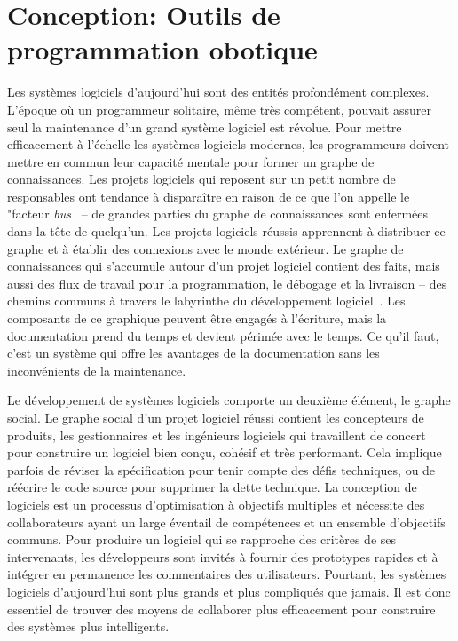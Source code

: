 \section{Conception: Outils de programmation obotique}

Les systèmes logiciels d'aujourd'hui sont des entités profondément complexes. L'époque où un programmeur solitaire, même très compétent, pouvait assurer seul la maintenance d'un grand système logiciel est révolue. Pour mettre efficacement à l'échelle les systèmes logiciels modernes, les programmeurs doivent mettre en commun leur capacité mentale pour former un graphe de connaissances. Les projets logiciels qui reposent sur un petit nombre de responsables ont tendance à disparaître en raison de ce que l'on appelle le "facteur \textit{bus}~\citep{cosentino2015assessing} -- de grandes parties du graphe de connaissances sont enfermées dans la tête de quelqu'un. Les projets logiciels réussis apprennent à distribuer ce graphe et à établir des connexions avec le monde extérieur. Le graphe de connaissances qui s'accumule autour d'un projet logiciel contient des faits, mais aussi des flux de travail pour la programmation, le débogage et la livraison -- des chemins communs à travers le labyrinthe du développement logiciel~\citep{naur1985programming}. Les composants de ce graphique peuvent être engagés à l'écriture, mais la documentation prend du temps et devient périmée avec le temps. Ce qu'il faut, c'est un système qui offre les avantages de la documentation sans les inconvénients de la maintenance.

Le développement de systèmes logiciels comporte un deuxième élément, le graphe social. Le graphe social d'un projet logiciel réussi contient les concepteurs de produits, les gestionnaires et les ingénieurs logiciels qui travaillent de concert pour construire un logiciel bien conçu, cohésif et très performant. Cela implique parfois de réviser la spécification pour tenir compte des défis techniques, ou de réécrire le code source pour supprimer la dette technique. La conception de logiciels est un processus d'optimisation à objectifs multiples et nécessite des collaborateurs ayant un large éventail de compétences et un ensemble d'objectifs communs. Pour produire un logiciel qui se rapproche des critères de ses intervenants, les développeurs sont invités à fournir des prototypes rapides et à intégrer en permanence les commentaires des utilisateurs. Pourtant, les systèmes logiciels d'aujourd'hui sont plus grands et plus compliqués que jamais. Il est donc essentiel de trouver des moyens de collaborer plus efficacement pour construire des systèmes plus intelligents.

